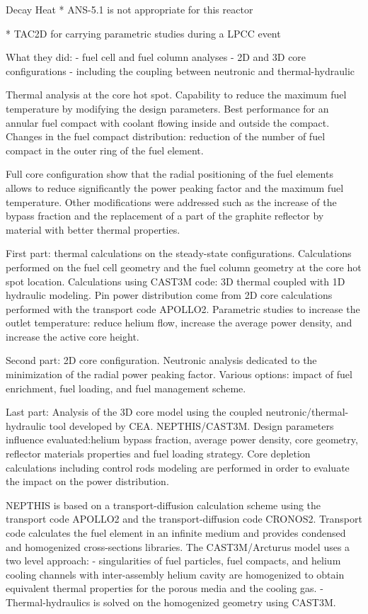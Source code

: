 Decay Heat
* ANS-5.1 is not appropriate for this reactor

* TAC2D for carrying parametric studies during a LPCC event

What they did:
- fuel cell and fuel column analyses
- 2D and 3D core configurations
- including the coupling between neutronic and thermal-hydraulic

Thermal analysis at the core hot spot.
Capability to reduce the maximum fuel temperature by modifying the design parameters.
Best performance for an annular fuel compact with coolant flowing inside and outside the compact.
Changes in the fuel compact distribution: reduction of the number of fuel compact in the outer ring of the fuel element.

Full core configuration show that the radial positioning of the fuel elements allows to reduce significantly the power peaking factor and the maximum fuel temperature.
Other modifications were addressed such as the increase of the bypass fraction and the replacement of a part of the graphite reflector by material with better thermal properties.

First part: thermal calculations on the steady-state configurations.
Calculations performed on the fuel cell geometry and the fuel column geometry at the core hot spot location.
Calculations using CAST3M code: 3D thermal coupled with 1D hydraulic modeling.
Pin power distribution come from 2D core calculations performed with the transport code APOLLO2.
Parametric studies to increase the outlet temperature: reduce helium flow, increase the average power density, and increase the active core height.

Second part:
2D core configuration.
Neutronic analysis dedicated to the minimization of the radial power peaking factor.
Various options: impact of fuel enrichment, fuel loading, and fuel management scheme.

Last part:
Analysis of the 3D core model using the coupled neutronic/thermal-hydraulic tool developed by CEA.
NEPTHIS/CAST3M.
Design parameters influence evaluated:helium bypass fraction, average power density, core geometry, reflector materials properties and fuel loading strategy.
Core depletion calculations including control rods modeling are performed in order to evaluate the impact on the power distribution.

NEPTHIS is based on a transport-diffusion calculation scheme using the transport code APOLLO2 and the transport-diffusion code CRONOS2.
Transport code calculates the fuel element in an infinite medium and provides condensed and homogenized cross-sections libraries.
The CAST3M/Arcturus model uses a two level approach:
- singularities of fuel particles, fuel compacts, and helium cooling channels with inter-assembly helium cavity are homogenized to obtain equivalent thermal properties for the porous media and the cooling gas.
- Thermal-hydraulics is solved on the homogenized geometry using CAST3M.

